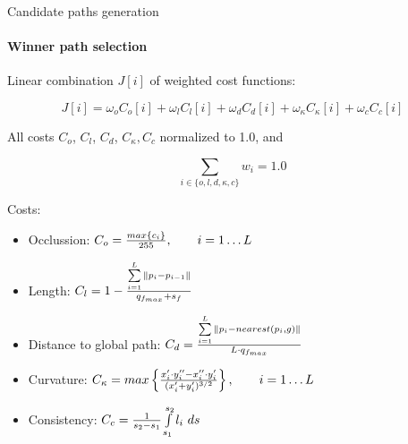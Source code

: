 \begin{frame}{Candidate paths generation}
  \framesubtitle{Winner path selection}
    
  \begin{itemize}
     {
    \item Linear combination $J[i]$ of weighted cost functions:
    \begin{minipage}[c]{\textwidth}
      \vskip 0.5cm
      \begin{equation}\nonumber
	J[i] = \omega_o C_o[i] + \omega_l C_l[i] + \omega_d C_d[i] + \omega_{\kappa} C_{\kappa}[i] + \omega_c C_c[i]
      \end{equation}
    \end{minipage}
    \vskip 1.0cm
    \item All costs $C_o$, $C_l$, $C_d$, $C_{\kappa}, C_c$ normalized to 1.0, and
    \begin{minipage}[c]{\textwidth}
      \vskip 0.5cm
      \begin{equation}\nonumber
	\sum_{{i \in \{o, l, d, \kappa, c\}}} w_i= 1.0
      \end{equation}
      \vskip 0.5cm
    \end{minipage}
    }
     {
    \item Costs:
    \begin{itemize}
     \item Occlussion: $C_o = {{max\{c_i\}} \over 255}, ~~~~~~ i=1 \dots L$
     \item Length: $C_l = 1- {{\sum\limits_{i=1}^{L}\|p_i - p_{i - 1}\|} \over {q_{f_{max}} + s_f}}$
     \item Distance to global path: $C_d = {{\sum\limits_{i=1}^{L}\|p_i - nearest(p_i, g)\|} \over {L \cdot q_{f_{max}}}}$
     \item Curvature: $C_{\kappa} = max \left \{ {{x_i' \cdot y_i'' - x_i'' \cdot y_i'} \over {(x_i' + y_i')^{3/2}}} \right \}, ~~~~~~ i=1 \dots L$
     \item Consistency: $C_c = {1 \over {s_2 - s_1}} \int \limits_{s_1}^{s_2} l_i ~ ds$
    \end{itemize}
  }
  \end{itemize}

  
  \note {
    
  }
\end{frame}

